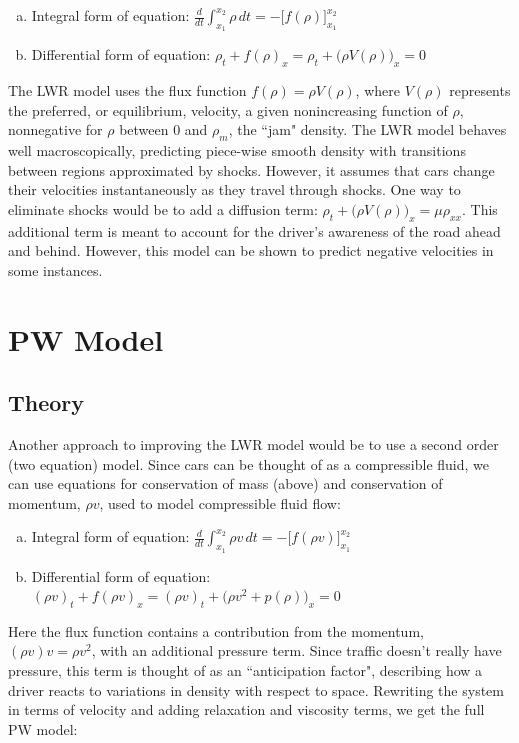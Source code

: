 \documentclass{article}
\begin{document}
\begin{enumerate}[(a)]
\item Integral form of equation: $\displaystyle \frac{d}{dt} \int_{x_1}^{x_2} \rho \, dt = -\Big[ f( \rho ) \Big]_{x_1}^{x_2}$
\item Differential form of equation: $\rho_t + f( \rho )_x = \rho_t + \Big( \rho V(\rho) \Big)_x = 0$
\end{enumerate}

The LWR model uses the flux function $f(\rho) = \rho V(\rho)$, where $V(\rho)$ represents the preferred, or equilibrium, velocity, a given nonincreasing function of $\rho$, nonnegative for $\rho$ between 0 and $\rho_m$, the ``jam" density.  The LWR model behaves well macroscopically, predicting piece-wise smooth density with transitions between regions approximated by shocks.  However, it assumes that cars change their velocities instantaneously as they travel through shocks.  One way to eliminate shocks would be to add a diffusion term: $\rho_t + \Big(\rho V(\rho))_x = \mu \rho_{xx}$.  This additional term is meant to account for the driver's awareness of the road ahead and behind.  However, this model can be shown to predict negative velocities in some instances.  

\section{PW Model}

\subsection{Theory}
Another approach to improving the LWR model would be to use a second order (two equation) model.  Since cars can be thought of as a compressible fluid, we can use equations for conservation of mass (above) and conservation of momentum, $\rho v$, used to model compressible fluid flow:

\begin{enumerate}[(a)]
\item Integral form of equation: $\displaystyle \frac{d}{dt} \int_{x_1}^{x_2} \rho v \, dt = -\Big[ f( \rho v ) \Big]_{x_1}^{x_2}$
\item Differential form of equation: $(\rho v)_t + f( \rho v )_x = (\rho v)_t + \Big( \rho v^2 + p(\rho) \Big)_x = 0$
\end{enumerate}

Here the flux function contains a contribution from the momentum, $(\rho v)v = \rho v^2$, with an additional pressure term.  Since traffic doesn't really have pressure, this term is thought of as an ``anticipation factor", describing how a driver reacts to variations in density with respect to space. Rewriting the system in terms of velocity and adding relaxation and viscosity terms, we get the full PW model:
\end{document}
